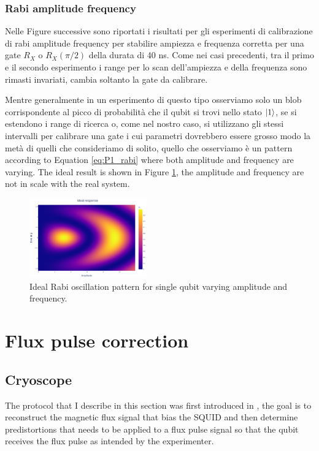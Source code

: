 \subsubsection{Rabi amplitude frequency}
Nelle Figure successive sono riportati i risultati per gli esperimenti di calibrazione di rabi amplitude frequency per stabilire ampiezza e frequenza corretta per una gate $R_X$ o $R_X(\pi/2)$ della durata di 40 ns.
Come nei casi precedenti, tra il primo e il secondo esperimento i range per lo scan dell'ampiezza e della frequenza sono rimasti invariati, cambia soltanto la gate da calibrare.

Mentre generalmente in un esperimento di questo tipo osserviamo solo un blob corrispondente al picco di probabilità che il qubit si trovi nello stato $\ket{1}$, 
se si estendono i range di ricerca o, come nel nostro caso, si utilizzano gli stessi intervalli per calibrare una gate i cui parametri dovrebbero essere grosso modo la metà di quelli che consideriamo di solito, quello che osserviamo è un pattern according to Equation \ref{eq:P1_rabi} where both amplitude and frequency are varying.
The ideal result is shown in Figure \ref{fig:expected_RX90}, the amplitude and frequency are not in scale with the real system.

\begin{figure}[h!]
    \centering
    \includegraphics[width=0.45\textwidth]{figures/png/IdealRX90.png}
    \caption{Ideal Rabi oscillation pattern for single qubit varying amplitude and frequency.}
    \label{fig:expected_RX90}
\end{figure}





\section{Flux pulse correction}

\subsection{Cryoscope}
The protocol that I describe in this section was first introduced in \cite{rol_time-domain_2020}, the goal is to reconstruct the magnetic flux signal that bias the SQUID and then determine predistortions that needs to be applied to a flux pulse signal so that the qubit receives the flux pulse as intended by the experimenter.

